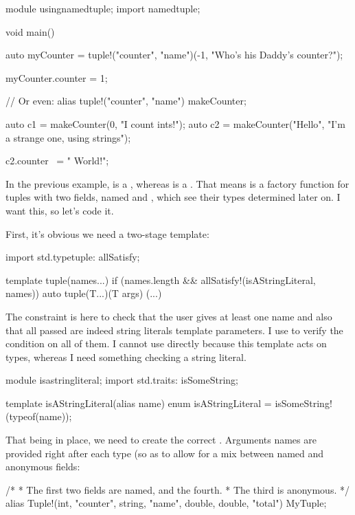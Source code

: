 \begin{dcode}
module usingnamedtuple;
import namedtuple;

void main()
{
    auto myCounter = tuple!("counter", "name")(-1, "Who's his Daddy's counter?");

    myCounter.counter = 1;

    // Or even:
    alias tuple!("counter", "name") makeCounter;

    auto c1 = makeCounter(0, "I count ints!");
    auto c2 = makeCounter("Hello", "I'm a strange one, using strings");

    c2.counter ~= " World!"; 
}
\end{dcode}

In the previous example,  is a \DD{,}\DD{)}, whereas  is a \DD{,}\DD{)}. That means  is a factory function for tuples with two fields, named  and , which see their types determined later on. I want this, so let's code it.

First, it's obvious we need a two-stage template:

\begin{dcode}
import std.typetuple: allSatisfy;

template tuple(names...) 
if (names.length && allSatisfy!(isAStringLiteral, names))
{
    auto tuple(T...)(T args)
    {
    (...)
    }
}
\end{dcode}

The constraint is here to check that the user gives at least one name and also that all passed  are indeed string literals template parameters. I use  to verify the condition on all of them. I cannot use directly  because this template acts on types, whereas I need something checking a string literal.

\begin{dcode}
module isastringliteral;
import std.traits: isSomeString;

template isAStringLiteral(alias name)
{
    enum isAStringLiteral = isSomeString!(typeof(name));
}
\end{dcode}

That being in place, we need to create the correct . Arguments names are provided right after each type (so as to allow for a mix between named and anonymous fields:

\begin{dcode}
/*
 * The first two fields are named, and the fourth.
 * The third is anonymous.
 */
alias Tuple!(int, "counter", string, "name", double, double, "total") MyTuple;
\end{dcode}

